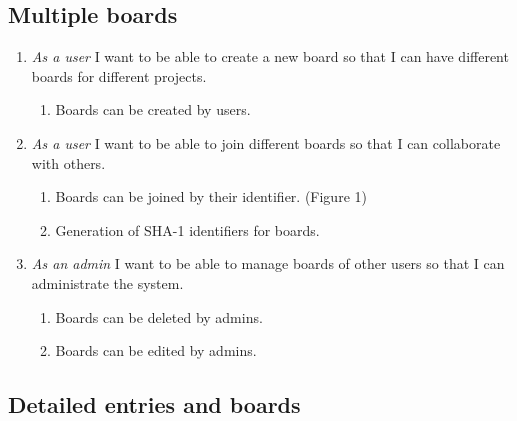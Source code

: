 \documentclass{article}
\begin{document}
	\subsection{Multiple boards}
	\begin{enumerate}
		\item \emph{As a user} I want to be able to create a new board so that I can have different boards for different projects.
			\begin{enumerate}
				\item Boards can be created by users.
			\end{enumerate}
		\item \emph{As a user} I want to be able to join different boards so that I can collaborate with others.
			\begin{enumerate}
				\item Boards can be joined by their identifier. (Figure 1)
				\item Generation of SHA-1 identifiers for boards.
			\end{enumerate}

		\item \emph{As an admin} I want to be able to manage boards of other users so that I can administrate the system.
			\begin{enumerate}
				\item Boards can be deleted by admins.
				\item Boards can be edited by admins.
			\end{enumerate}
	\end{enumerate}

	\subsection{Detailed entries and boards}
\end{document}
